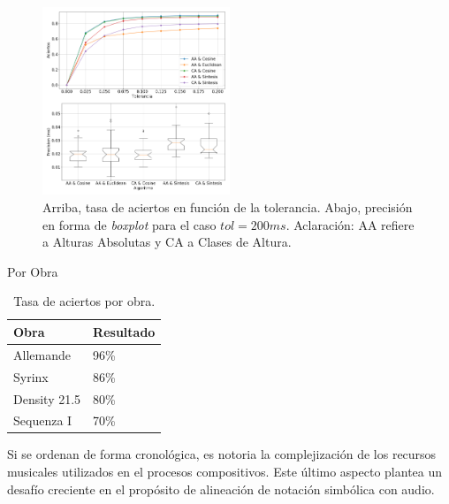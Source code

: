 \documentclass
  [ams,pdfout]%
	{aeslac}
\begin{document}
\begin{figure}[h!]
\begin{center}
\includegraphics[width=0.5\textwidth]{imagenes/comparacion} 	
\caption{Arriba, tasa de aciertos en función de la tolerancia. Abajo, precisión en forma de \textit{boxplot} para el caso $tol=200ms$. Aclaración: AA refiere a Alturas Absolutas y CA a Clases de Altura.}
\label{fig:datos_tabla}
\end{center}
\end{figure}


Por Obra

\begin{table}[!ht]
\caption{Tasa de aciertos por obra.}
\label{tab:por_obra}
\vspace*{10pt}
\centering
\small
\begin{tabular}{ll}
\textbf{Obra}	&	\textbf{Resultado}\\ \hline
Allemande     & 96\%   \\
Syrinx & 86\%   \\
Density 21.5 & 80\%   \\
Sequenza I & 70\%   \\
\end{tabular}
\end{table}

Si se ordenan de forma cronológica, es notoria la complejización de los recursos musicales utilizados en el procesos compositivos. Este último aspecto plantea un desafío creciente en el propósito de alineación de notación simbólica con audio.  


%
%
%
\end{document}
